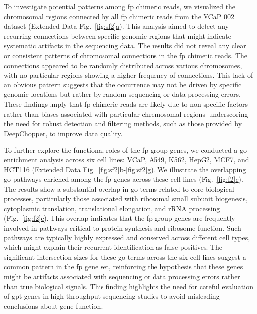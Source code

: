 \documentclass[pdflatex, sn-mathphys-num, lineno]{sn-jnl}%
\newcommand{\figref}[2]{Fig.~\hyperref[#1]{\ref*{#1}#2}}
\newcommand{\edfigref}[2]{Extended Data Fig.~\hyperref[#1]{\ref*{#1}#2}}
\newcommand{\edfigrefrg}[3]{Extended Data Fig.~\hyperref[#1]{\ref*{#1}#2-\ref*{#1}#3}}
\theoremstyle{thmstyleone}%
\theoremstyle{thmstyletwo}%
\theoremstyle{thmstylethree}%
\begin{document}
To investigate potential patterns among \gls{fp} chimeric reads, we visualized the chromosomal regions connected by all \gls{fp} chimeric reads from the VCaP 002 dataset (\edfigref{fig:sf2}{a}).
This analysis aimed to detect any recurring connections between specific genomic regions that might indicate systematic artifacts in the sequencing data.
The results did not reveal any clear or consistent patterns of chromosomal connections in the \gls{fp} chimeric reads.
The connections appeared to be randomly distributed across various chromosomes, with no particular regions showing a higher frequency of connections.
This lack of an obvious pattern suggests that the occurrence may not be driven by specific genomic locations but rather by random sequencing or data processing errors.
These findings imply that \gls{fp} chimeric reads are likely due to non-specific factors rather than biases associated with particular chromosomal regions, underscoring the need for robust detection and filtering methods, such as those provided by DeepChopper, to improve data quality.


To further explore the functional roles of the \gls{fp} group genes, we conducted a \gls{go} enrichment analysis across six cell lines: VCaP, A549, K562, HepG2, MCF7, and HCT116 (\edfigrefrg{fig:sf2}{b}{g}).
We illustrate the overlapping \gls{go} pathways enriched among the \gls{fp} genes across these cell lines (\figref{fig:f2}{c}).
The results show a substantial overlap in \gls{go} terms related to core biological processes, particularly those associated with ribosomal small subunit biogenesis, cytoplasmic translation, translational elongation, and rRNA processing (\figref{fig:f2}{c}).
This overlap indicates that the \gls{fp} group genes are frequently involved in pathways critical to protein synthesis and ribosome function.
Such pathways are typically highly expressed and conserved across different cell types, which might explain their recurrent identification as false positives.
The significant intersection sizes for these \gls{go} terms across the six cell lines suggest a common pattern in the \gls{fp} gene set, reinforcing the hypothesis that these genes might be artifacts associated with sequencing or data processing errors rather than true biological signals.
This finding highlights the need for careful evaluation of \gls{gpt} genes in high-throughput sequencing studies to avoid misleading conclusions about gene function.
\end{document}
